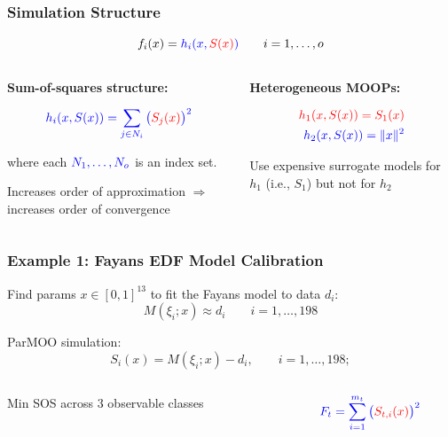 \documentclass[aspectratio=169]{beamer}
\begin{document}
\begin{frame}\frametitle{Simulation Structure}
{\Large
$$
f_i(x) = {\color{blue}h_i(x, {\color{red}S(x)} )}
\qquad i = 1, \ldots, o
$$
}
\begin{columns}
\begin{column}{0.5\textwidth}
\pause
\textbf{Sum-of-squares structure:}

\medskip

{\large
$$
{\color{blue} h_i(x, S(x)) = \sum_{j \in N_i} \big({\color{red}S_j(x)}\big)^2}
$$

where each ${\color{blue} N_1, \ldots, N_o}$ is an index set.
}

\bigskip

Increases order of approximation $\Rightarrow$
increases order of convergence

\end{column}
\begin{column}{0.5\textwidth}
\pause
\textbf{Heterogeneous MOOPs:}

{\large
\begin{align*}
{\color{red} h_1(x, S(x)) = S_1(x)}\\
{\color{blue} h_2(x, S(x)) = \|x \|^2}
\end{align*}
}

Use expensive surrogate models for {\color{red} $h_1$} (i.e.,
{\color{red} $S_1$}) but not for {\color{blue} $h_2$}

\end{column}
\end{columns}
\end{frame}

\begin{frame}\frametitle{Example 1: Fayans EDF Model Calibration}
Find params $x \in [0, 1]^{13}$ to fit the Fayans model to data $d_i$:
$$
M\left(\xi_{i};x\right) \approx d_{i} \qquad i=1,\ldots, 198
$$

\medskip

ParMOO simulation:
$$
S_{i}(x) = M\left(\xi_{i};x\right) - d_{i},
\qquad i=1,\ldots, 198;
$$

\medskip

\begin{columns}
\begin{column}{0.65\textwidth}
Min SOS across 3 observable classes
\end{column}
\begin{column}{0.35\textwidth}
$$
{\color{blue}F_t = \sum_{i=1}^{m_t}\big({\color{red}S_{t,i}(x)}\big)^2}
$$
\end{column}
\end{columns}

\end{frame}
\end{document}
